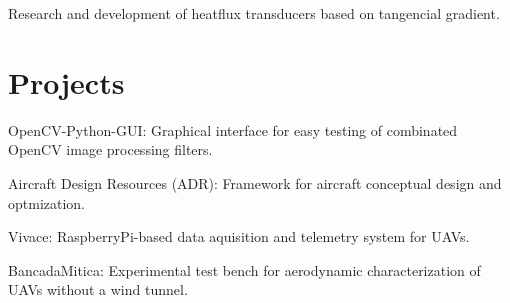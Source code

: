 \documentclass[A4]{deedy-resume} %
\begin{document}
\begin{minipage}[t]{0.67\textwidth}
\vspace{\topsep} %
\begin{tightitemize}
\item Research and development of heatflux transducers based on tangencial gradient.
\end{tightitemize}

\section{Projects}

\vspace{\topsep}
\begin{tightitemize}
\item OpenCV-Python-GUI: Graphical interface for easy testing of combinated OpenCV image processing filters.
\item Aircraft Design Resources (ADR): Framework for aircraft conceptual design and optmization.
\item Vivace: RaspberryPi-based data aquisition and telemetry system for UAVs.
\item BancadaMitica: Experimental test bench for aerodynamic characterization of UAVs without a wind tunnel.
\end{tightitemize}
 
\sectionspace %

\end{minipage} %

\end{document}
